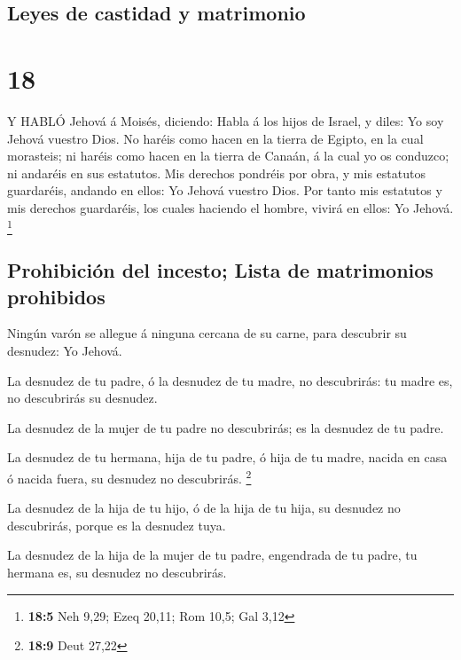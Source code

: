\hypertarget{leyes-de-castidad-y-matrimonio}{%
\subsection{Leyes de castidad y
matrimonio}\label{leyes-de-castidad-y-matrimonio}}

\hypertarget{section-17}{%
\section{18}\label{section-17}}

 Y HABLÓ Jehová á Moisés, diciendo:  Habla á los
hijos de Israel, y diles: Yo soy Jehová vuestro Dios.  No
haréis como hacen en la tierra de Egipto, en la cual morasteis; ni
haréis como hacen en la tierra de Canaán, á la cual yo os conduzco; ni
andaréis en sus estatutos.  Mis derechos pondréis por obra,
y mis estatutos guardaréis, andando en ellos: Yo Jehová vuestro Dios.
 Por tanto mis estatutos y mis derechos guardaréis, los
cuales haciendo el hombre, vivirá en ellos: Yo Jehová. \footnote{\textbf{18:5}
  Neh 9,29; Ezeq 20,11; Rom 10,5; Gal 3,12}

\hypertarget{prohibiciuxf3n-del-incesto-lista-de-matrimonios-prohibidos}{%
\subsection{Prohibición del incesto; Lista de matrimonios
prohibidos}\label{prohibiciuxf3n-del-incesto-lista-de-matrimonios-prohibidos}}

 Ningún varón se allegue á ninguna cercana de su carne, para
descubrir su desnudez: Yo Jehová.

 La desnudez de tu padre, ó la desnudez de tu madre, no
descubrirás: tu madre es, no descubrirás su desnudez.

 La desnudez de la mujer de tu padre no descubrirás; es la
desnudez de tu padre.

 La desnudez de tu hermana, hija de tu padre, ó hija de tu
madre, nacida en casa ó nacida fuera, su desnudez no descubrirás.
\footnote{\textbf{18:9} Deut 27,22}

 La desnudez de la hija de tu hijo, ó de la hija de tu
hija, su desnudez no descubrirás, porque es la desnudez tuya.

 La desnudez de la hija de la mujer de tu padre, engendrada
de tu padre, tu hermana es, su desnudez no descubrirás.

